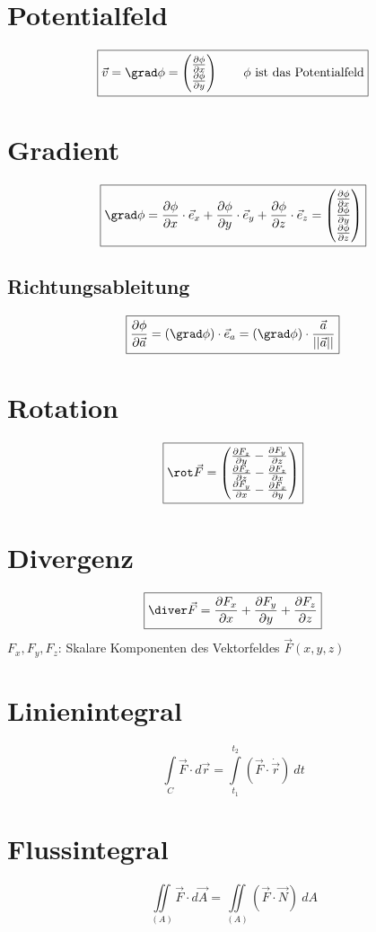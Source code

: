 \section{Potentialfeld}
\[ \boxed{\vec{v} = \grad \phi =
\left(\begin{array}{@{}l@{}} 
\frac{\partial \phi}{\partial x} \\
\frac{\partial \phi}{\partial y} \\
\end{array}\right) \qquad \text{$\phi$ ist das Potentialfeld}} \]

\section{Gradient}
\[ \boxed{\grad \phi = \frac{\partial \phi}{\partial x} \cdot \vec{e}_x 
+ \frac{\partial \phi}{\partial y} \cdot \vec{e}_y 
+ \frac{\partial \phi}{\partial z} \cdot \vec{e}_z 
= \left(\begin{array}{@{}l@{}} 
\frac{\partial \phi}{\partial x} \\
\frac{\partial \phi}{\partial y} \\
\frac{\partial \phi}{\partial z} \\
\end{array}\right)} \]

\subsection{Richtungsableitung}
\[ \boxed{\frac{\partial \phi}{\partial \vec{a}} 
= (\grad \phi) \cdot \vec{e}_a 
= (\grad \phi) \cdot \frac{\vec{a}}{||\vec{a}||}} \]

\section{Rotation}
\[ \boxed{\rot \vec{F} = \left( \begin{array}{@{}l@{}} 
\frac{\partial F_z}{\partial y} - \frac{\partial F_y}{\partial z} \\
\frac{\partial F_x}{\partial z} - \frac{\partial F_z}{\partial x} \\
\frac{\partial F_y}{\partial x} - \frac{\partial F_x}{\partial y} \\
\end{array}\right)} \]

\section{Divergenz}
\[ \boxed{\diver \vec{F} = \frac{\partial F_x}{\partial x} 
+ \frac{\partial F_y}{\partial y} + \frac{\partial F_z}{\partial z}} \]
$F_x, F_y, F_z$: Skalare Komponenten des Vektorfeldes $\vec{F}(x,y,z)$

\section{Linienintegral}
\[ \boxed{\int\limits_{C} \vec{F} \cdot d\vec{r} 
= \int\limits_{t_1}^{t_2} \left(\vec{F} \cdot \dot{\vec{r}}\right) ~ dt} \]

\section{Flussintegral}
\[  \boxed{\iint\limits_{(A)} \vec{F} \cdot d\vec{A} = \iint\limits_{(A)} (\vec{F} \cdot \vec{N}) ~ dA} \]